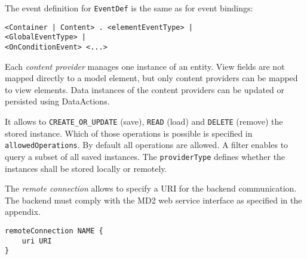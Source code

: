 The event definition for \lstinline!EventDef! is the same as for event bindings:
\begin{lstlisting}
<Container | Content> . <elementEventType> |
<GlobalEventType> |
<OnConditionEvent> <...>
\end{lstlisting}

Each \textit{content provider} manages one instance of an entity. View fields are not mapped directly to a model element, but only content providers can be mapped to view elements. Data instances of the content providers can be updated or persisted using DataActions.

It allows to \lstinline!CREATE_OR_UPDATE! (save), \lstinline!READ! (load) and \lstinline!DELETE! (remove) the stored instance. Which of those operations is possible is specified in \lstinline!allowedOperations!. By default all operations are allowed. A filter enables to query a subset of all saved instances. The \lstinline!providerType! defines whether the instances shall be stored locally or remotely.

The \textit{remote connection} allows to specify a URI for the backend communication. The backend must comply with the MD2 web service interface as specified in the appendix.
\begin{lstlisting}
remoteConnection NAME {
	uri URI
}
\end{lstlisting}
